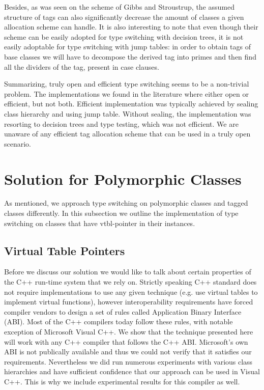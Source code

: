 \documentclass[preprint]{sigplanconf}
\begin{document}
Besides, as was seen on the scheme of Gibbs and Stroustrup, the assumed 
structure of tags can also significantly decrease the amount of classes a given 
allocation scheme can handle. It is also interesting to note that even though 
their scheme can be easily adopted for type switching with decision trees, it is 
not easily adoptable for type switching with jump tables: in order to obtain 
tags of base classes we will have to decompose the derived tag into primes and 
then find all the dividers of the tag, present in case clauses.

Summarizing, truly open and efficient type switching seems to be a non-trivial 
problem. The implementations we found in the literature where either open or 
efficient, but not both. Efficient implementation was typically achieved by 
sealing class hierarchy and using jump table. Without sealing, the implementation 
was resorting to decision trees and type testing, which was not efficient.
We are unaware of any efficient tag allocation scheme that can be used in a 
truly open scenario.

\section{Solution for Polymorphic Classes}
\label{sec:copc}

As mentioned, we approach type switching on polymorphic classes and tagged 
classes differently. In this subsection we outline the implementation of type 
switching on classes that have vtbl-pointer in their instances.

\subsection{Virtual Table Pointers}
\label{sec:vtp}

Before we discuss our solution we would like to talk about certain properties of 
the C++ run-time system that we rely on. Strictly speaking C++ standard does not 
require implementations to use any given technique (e.g. use virtual tables to 
implement virtual functions), however interoperability requirements have forced 
compiler vendors to design a set of rules called Application Binary Interface 
(ABI)\cite{C++ABI}. Most of the C++ compilers today follow these rules, with 
notable exception of Microsoft Visual C++. We show that the technique presented 
here will work with any C++ compiler that follows the C++ ABI. Microsoft's own 
ABI is not publically available and thus we could not verify that it satisfies 
our requirements. Nevertheless we did run numerous experiments with various 
class hierarchies and have sufficient confidence that our approach can be used 
in Visual C++. This is why we include experimental results for this compiler as 
well.
\end{document}
